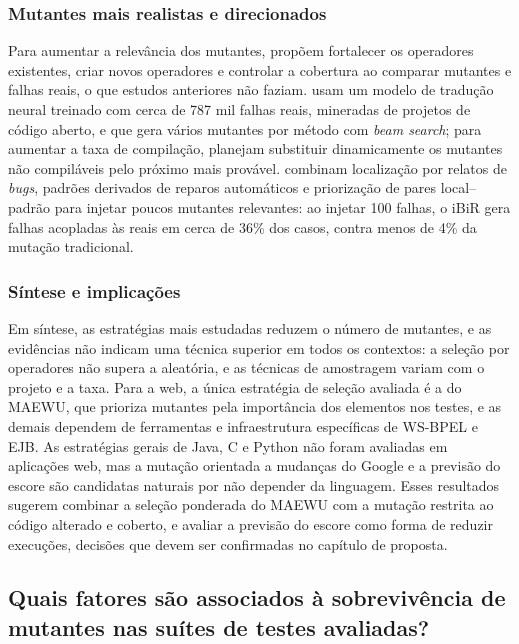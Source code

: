 \subsubsection{Mutantes mais realistas e direcionados}
\label{subsubsec:mutantes-realistas}

Para aumentar a relevância dos mutantes,  propõem fortalecer os operadores existentes, criar novos operadores e controlar a cobertura ao comparar mutantes e falhas reais, o que estudos anteriores não faziam.  usam um modelo de tradução neural treinado com cerca de 787 mil falhas reais, mineradas de projetos de código aberto, e que gera vários mutantes por método com \textit{beam search}; para aumentar a taxa de compilação, planejam substituir dinamicamente os mutantes não compiláveis pelo próximo mais provável.  combinam localização por relatos de \textit{bugs}, padrões derivados de reparos automáticos e priorização de pares local--padrão para injetar poucos mutantes relevantes: ao injetar 100 falhas, o iBiR gera falhas acopladas às reais em cerca de 36\% dos casos, contra menos de 4\% da mutação tradicional.

\subsubsection{Síntese e implicações}
\label{subsubsec:sintese-estrategias}

Em síntese, as estratégias mais estudadas reduzem o número de mutantes, e as evidências não indicam uma técnica superior em todos os contextos: a seleção por operadores não supera a aleatória, e as técnicas de amostragem variam com o projeto e a taxa. Para a web, a única estratégia de seleção avaliada é a do MAEWU, que prioriza mutantes pela importância dos elementos nos testes, e as demais dependem de ferramentas e infraestrutura específicas de WS-BPEL e EJB. As estratégias gerais de Java, C e Python não foram avaliadas em aplicações web, mas a mutação orientada a mudanças do Google e a previsão do escore são candidatas naturais por não depender da linguagem. Esses resultados sugerem combinar a seleção ponderada do MAEWU com a mutação restrita ao código alterado e coberto, e avaliar a previsão do escore como forma de reduzir execuções, decisões que devem ser confirmadas no capítulo de proposta.

\subsection[Fatores associados a sobrevivência de mutantes]{Quais fatores são associados à sobrevivência de mutantes nas suítes de testes avaliadas?}
\label{subsec:fatores-sobrevivencia}

